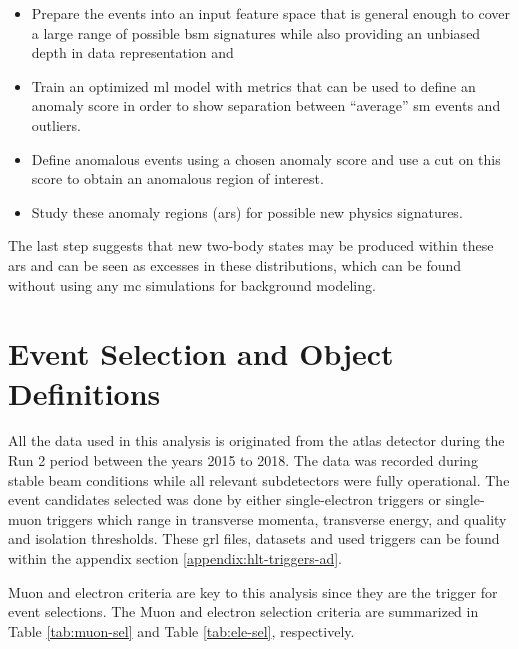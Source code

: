 \begin{itemize}
    \item Prepare the events into an input feature space that is general enough to cover a large range of possible \gls{bsm} signatures while also providing an unbiased depth in data representation and 
    \item Train an optimized \gls{ml} model with metrics that can be used to define an anomaly score in order to show separation between ``average'' \gls{sm} events and outliers.
    \item Define anomalous events using a chosen anomaly score and use a cut on this score to obtain an anomalous region of interest.
    \item Study these anomaly regions (\gls{ar}s) for possible new physics signatures.
\end{itemize}

The last step suggests that new two-body states may be produced within these \gls{ar}s and can be seen as excesses in these distributions, which can be found without using any \gls{mc} simulations 
for background modeling. 

\section{Event Selection and Object Definitions}

All the data used in this analysis is originated from the \gls{atlas} detector during the Run 2 period between the years 2015 to 2018. The data was recorded during stable beam conditions 
while all relevant subdetectors were fully operational. The event candidates selected was done by either single-electron triggers or single-muon triggers which range in transverse momenta, 
transverse energy, and quality and isolation thresholds. These \gls{grl} files, datasets and used triggers can be found within the appendix section \ref{appendix:hlt-triggers-ad}.
\par
Muon and electron criteria are key to this analysis since they are the trigger for event selections. The Muon and electron selection criteria are summarized in Table \ref{tab:muon-sel} and Table \ref{tab:ele-sel}, respectively. 

